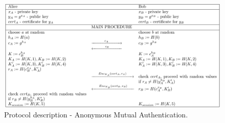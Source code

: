 \documentclass[11pt,titlepage]{article}
\theoremstyle{plain}
\begin{document}
\newcommand{\newCA}{$c_A$}
\newcommand{\newCB}{$c_B$}
\newcommand{\newEncA}{$Enc_{K_A}(cert_A,r_A)$}
\newcommand{\newEncB}{$Enc_{K_B}(cert_B,r_B)$}
\begin{figure}[H]

\begin{center}
\includegraphics[width=1.1\textwidth]{img/AMAprotocol.pdf}
\caption{Protocol description - Anonymous Mutual Authentication.}
\label{fig:F8}
\end{center}
\end{figure}
\end{document}
